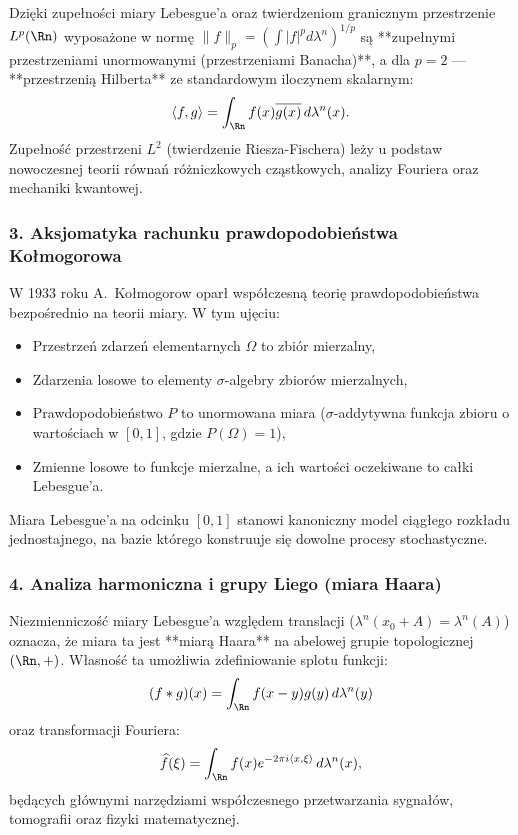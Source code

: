 Dzięki zupełności miary Lebesgue'a oraz twierdzeniom granicznym przestrzenie $L^p(\Rn)$ wyposażone w normę $\|f\|_p = \left( \int |f|^p d\lambda^n \right)^{1/p}$ są **zupełnymi przestrzeniami unormowanymi (przestrzeniami Banacha)**, a dla $p = 2$ — **przestrzenią Hilberta** ze standardowym iloczynem skalarnym:
\begin{equation}
    \langle f, g \rangle = \int_{\Rn} f(x) \overline{g(x)} \, d\lambda^n(x).
\end{equation}
Zupełność przestrzeni $L^2$ (twierdzenie Riesza-Fischera) leży u podstaw nowoczesnej teorii równań różniczkowych cząstkowych, analizy Fouriera oraz mechaniki kwantowej.

\subsubsection{3. Aksjomatyka rachunku prawdopodobieństwa Kołmogorowa}

W 1933 roku A.~Kołmogorow oparł współczesną teorię prawdopodobieństwa bezpośrednio na teorii miary. W tym ujęciu:
\begin{itemize}
    \item Przestrzeń zdarzeń elementarnych $\Omega$ to zbiór mierzalny,
    \item Zdarzenia losowe to elementy $\sigma$-algebry zbiorów mierzalnych,
    \item Prawdopodobieństwo $P$ to unormowana miara ($\sigma$-addytywna funkcja zbioru o wartościach w $[0, 1]$, gdzie $P(\Omega) = 1$),
    \item Zmienne losowe to funkcje mierzalne, a ich wartości oczekiwane to całki Lebesgue'a.
\end{itemize}
Miara Lebesgue'a na odcinku $[0, 1]$ stanowi kanoniczny model ciągłego rozkładu jednostajnego, na bazie którego konstruuje się dowolne procesy stochastyczne.

\subsubsection{4. Analiza harmoniczna i grupy Liego (miara Haara)}

Niezmienniczość miary Lebesgue'a względem translacji ($\lambda^n(x_0 + A) = \lambda^n(A)$) oznacza, że miara ta jest **miarą Haara** na abelowej grupie topologicznej $(\Rn, +)$. Własność ta umożliwia zdefiniowanie splotu funkcji:
\begin{equation}
    (f * g)(x) = \int_{\Rn} f(x - y) g(y) \, d\lambda^n(y)
\end{equation}
oraz transformacji Fouriera:
\begin{equation}
    \widehat{f}(\xi) = \int_{\Rn} f(x) e^{-2\pi i \langle x, \xi \rangle} \, d\lambda^n(x),
\end{equation}
będących głównymi narzędziami współczesnego przetwarzania sygnałów, tomografii oraz fizyki matematycznej.
